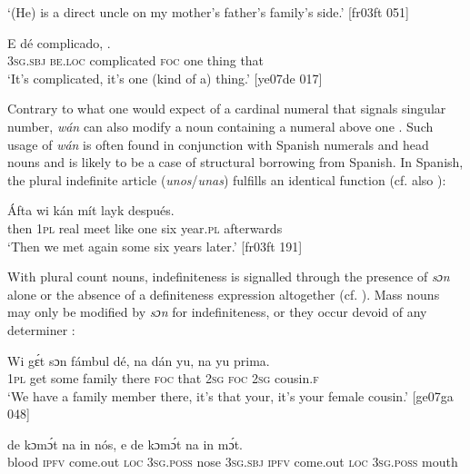 \glt ‘(He) is a direct uncle on my mother’s father’s family’s side.’ [fr03ft 051]
\z


\ea%
    \label{ex:key:179}
    \gll E    dé    complicado,            .\\
\textsc{3sg.sbj}  \textsc{be.loc}  complicated  \textsc{foc}  one    thing  that\\

\glt ‘It’s complicated, it’s one (kind of a) thing.’ [ye07de 017]
\z

Contrary to what one would expect of a cardinal numeral that signals singular number, \textit{wán} can also modify a noun containing a numeral above one . Such usage of \textit{wán} is often found in conjunction with Spanish numerals and head nouns and is likely to be a case of structural borrowing from Spanish. In Spanish, the plural indefinite article (\textit{unos}/\textit{unas}) fulfills an identical function (cf. also ): 


\ea%
    \label{ex:key:180}
    \gll \'{A}fta    wi  kán  mít    layk              después.\\
then  \textsc{1pl}  real  meet  like    one    six    year.\textsc{pl}  afterwards\\

\glt ‘Then we met again some six years later.’ [fr03ft 191]
\z

With\textit{} plural count nouns, indefiniteness is signalled through the presence of \textit{sɔn} alone  or the absence of a definiteness expression altogether (cf. ). Mass nouns may only be modified by \textit{sɔn} for indefiniteness, or they occur devoid of any determiner : 


\ea%
    \label{ex:key:181}
    \gll Wi  gɛ́t  sɔn    fámbul  dé,    na  dán  yu,  na  yu  prima.\\
\textsc{1pl}  get  some  family  there  \textsc{foc}  that  \textsc{2sg}  \textsc{foc}  \textsc{2sg}  cousin.\textsc{f}\\

\glt ‘We have a family member there, it’s that your, it’s your female cousin.’ [ge07ga 048]
\z


\ea%
    \label{ex:key:182}
    \gll {}  de  kɔmɔ́t    na  in    nós,    e    de  kɔmɔ́t
na  in    mɔ́t.\\
blood  \textsc{ipfv}  come.out  \textsc{loc}  \textsc{3sg.poss}  nose  \textsc{3sg.sbj}  \textsc{ipfv}  come.out
\textsc{loc}  \textsc{3sg.poss}  mouth\\

